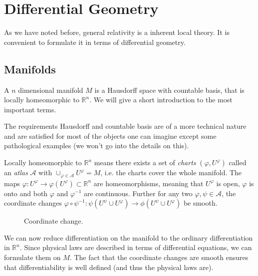 \chapter{Differential Geometry}
As we have noted before, general relativity is a inherent local theory. It is
convenient to formulate it in terms of differential geometry.
\section{Manifolds}
\begin{definition}
A $n$ dimensional manifold $M$ is a Hausdorff space with countable basis, that
is locally homeomorphic to $\mathbb{R}^n$. We will give a short introduction to
the most important terms.
\end{definition}
\begin{remark}
The requirements Hausdorff and countable basis are of a more technical nature and are satisfied for most of the objects one can imagine 
except some pathological examples (we won't go into the details on this).

Locally homeomorphic to $\mathbb{R}^n$ means there exists a set of \emph{charts} 
$(\varphi,U^\varphi)$ called an \emph{atlas} $\mathcal{A}$ with $\cup_{\varphi\in\mathcal{A}} U^\varphi =M$, 
i.e. the charts cover the whole manifold. The maps $\varphi:U^\varphi\to \varphi(U^\varphi)\subset\mathbb{R}^n $ are homeomorphisms, 
meaning that $U^\varphi$ is open, $\varphi$ is onto and both $\varphi$ and
$\varphi^{-1}$ are continuous.
Further for any two $\varphi,\psi\in \mathcal{A}$, the coordinate changes 
$\varphi\circ\psi^{-1}:\psi(U^\psi\cup U^\varphi)\to \phi(U^\psi\cup U^\varphi)$
be smooth\footnotemark .
\end{remark}
\begin{figure}
    \begin{center}
    \end{center}
    \caption{Coordinate change.} %
\end{figure}
We can now reduce differentiation on the manifold to the ordinary differentiation in $\mathbb{R}^n$. 
Since physical laws are described in terms of differential equations, we can formulate them on $M$. 
The fact that the coordinate changes are smooth ensures that differentiability
is well defined (and thus the physical laws are).

